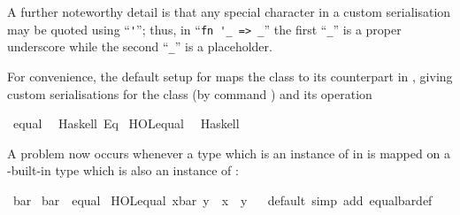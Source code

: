 \begin{isabellebody}
\begin{isamarkuptext}
  A further noteworthy detail is that any special character in a
  custom serialisation may be quoted using ``\verb|'|''; thus,
  in ``\verb|fn '_ => _|'' the first ``\verb|_|'' is a
  proper underscore while the second ``\verb|_|'' is a
  placeholder.%
\end{isamarkuptext}%
\isamarkuptrue%
%
\isamarkuptrue%
%
\begin{isamarkuptext}%
For convenience, the default  setup for 
  maps the  class to its counterpart in ,
  giving custom serialisations for the class  (by command
  \hypertarget{command.code-class}{\hyperlink{command.code-class}{\mbox{}}}) and its operation %
\end{isamarkuptext}%
\isamarkuptrue%
%
\isadelimquotett
%
\endisadelimquotett
%
\isatagquotett
{}\isamarkupfalse%
\ equal\isanewline
\ \ {\isacharparenleft}Haskell\ {\isachardoublequoteopen}Eq{\isachardoublequoteclose}{\isacharparenright}\isanewline
\isanewline
{}\isamarkupfalse%
\ {\isachardoublequoteopen}HOL{\isachardot}equal{\isachardoublequoteclose}\isanewline
\ \ {\isacharparenleft}Haskell\ \ {}\ {\isachardoublequoteopen}{\isacharequal}{\isacharequal}{\isachardoublequoteclose}{\isacharparenright}%
\endisatagquotett
{\isafoldquotett}%
%
\isadelimquotett
%
\endisadelimquotett
%
\begin{isamarkuptext}%
\noindent A problem now occurs whenever a type which is an instance
  of  in  is mapped on a -built-in type which is also an instance of 
  :%
\end{isamarkuptext}%
\isamarkuptrue%
%
\isadelimquote
%
\endisadelimquote
%
\isatagquote
{}\isamarkupfalse%
\ bar\isanewline
\isanewline
{}\isamarkupfalse%
\ bar\ {\isacharcolon}{\isacharcolon}\ equal\isanewline
{}\isanewline
\isanewline
{}\isamarkupfalse%
\ {\isachardoublequoteopen}HOL{\isachardot}equal\ {\isacharparenleft}x{\isasymColon}bar{\isacharparenright}\ y\ {\isasymlongleftrightarrow}\ x\ {\isacharequal}\ y{\isachardoublequoteclose}\isanewline
\isanewline
{}\isamarkupfalse%
\ \isamarkupfalse%
\ default\ {\isacharparenleft}simp\ add{\isacharcolon}\ equal{\isacharunderscore}bar{\isacharunderscore}def{\isacharparenright}\isanewline

\end{isabellebody}
